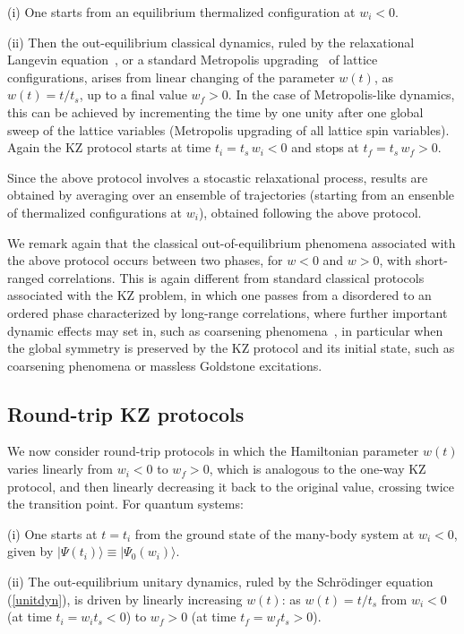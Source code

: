 (i) One starts from an equilibrium thermalized configuration at $w_i <
0$.
  
(ii) Then the out-equilibrium classical dynamics, ruled by the
relaxational Langevin equation~\cite{HH-77}, or a standard Metropolis
upgrading~\cite{Metropolis:1953am} of lattice configurations, arises
from linear changing of the parameter $w(t)$, as $w(t) = t/t_s$, up to
a final value $w_f>0$.  In the case of Metropolis-like dynamics, this
can be achieved by incrementing the time by one unity after one global
sweep of the lattice variables (Metropolis upgrading of all lattice
spin variables).  Again the KZ protocol starts at time $t_i = t_s \,
w_i<0$ and stops at $t_f= t_s \, w_f>0$.

Since the above protocol involves a stocastic relaxational
process, results are obtained by averaging over an ensemble of
trajectories (starting from an ensenble of thermalized configurations
at $w_i$), obtained following the above protocol.

We remark again that the classical out-of-equilibrium phenomena
associated with the above protocol occurs between two phases, for
$w<0$ and $w>0$, with short-ranged correlations.  This is again
different from standard classical protocols associated with the KZ
problem, in which one passes from a disordered to an ordered phase
characterized by long-range correlations, where further important dynamic
effects may set in, such as coarsening phenomena~\cite{CEGS-12},
in particular when the global symmetry is preserved by the KZ protocol
and its initial state, such as coarsening phenomena or massless
Goldstone excitations.



\subsection{Round-trip KZ protocols}
\label{rtpro}


We now consider round-trip protocols in which the Hamiltonian
parameter $w(t)$ varies linearly from $w_i<0$ to $w_f>0$, which is
analogous to the one-way KZ protocol, and then linearly decreasing it
back to the original value, crossing twice the transition point. For
quantum systems:

(i) One starts at $t=t_i$ from the ground state of the many-body
system at $w_i < 0$, given by $|\Psi(t_i)\rangle \equiv
|\Psi_0(w_i)\rangle$.
  
(ii) The out-equilibrium unitary dynamics, ruled by the Schr\"odinger
equation (\ref{unitdyn}), is driven by linearly increasing $w(t)$: as
$w(t) = t/t_s$ from $w_i<0$ (at time $t_i=w_i t_s<0$) to $w_f>0$ (at
time $t_f = w_f t_s>0$).

